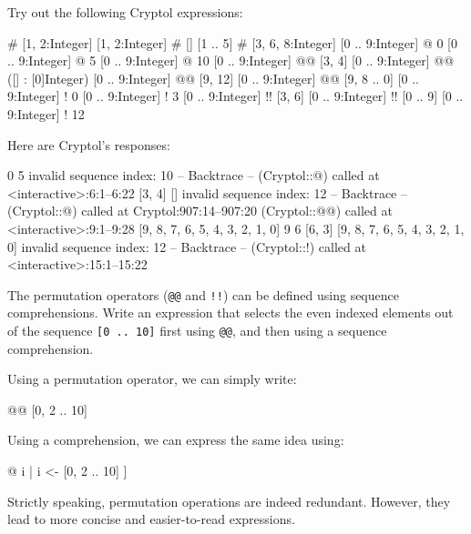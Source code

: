 
\restartrepl
\begin{Exercise}\label{ex:seq:7}
Try out the following Cryptol expressions:
\begin{replinVerb}
  [] # [1, 2:Integer]
  [1, 2:Integer] # []
  [1 .. 5] # [3, 6, 8:Integer]
  [0 .. 9:Integer] @ 0
  [0 .. 9:Integer] @ 5
  [0 .. 9:Integer] @ 10
  [0 .. 9:Integer] @@ [3, 4]
  [0 .. 9:Integer] @@ ([] : [0]Integer)
  [0 .. 9:Integer] @@ [9, 12]
  [0 .. 9:Integer] @@ [9, 8 .. 0]
  [0 .. 9:Integer] ! 0
  [0 .. 9:Integer] ! 3
  [0 .. 9:Integer] !! [3, 6]
  [0 .. 9:Integer] !! [0 .. 9]
  [0 .. 9:Integer] ! 12
\end{replinVerb}
\end{Exercise}
\begin{Answer}
Here are Cryptol's responses:
\begin{reploutVerb}
  [1, 2]
  [1, 2]
  [1, 2, 3, 4, 5, 3, 6, 8]
  0
  5
  invalid sequence index: 10
  -- Backtrace --
  (Cryptol::@) called at <interactive>:6:1--6:22
  [3, 4]
  []
  invalid sequence index: 12
   -- Backtrace --
  (Cryptol::@) called at Cryptol:907:14--907:20
  (Cryptol::@@) called at <interactive>:9:1--9:28
  [9, 8, 7, 6, 5, 4, 3, 2, 1, 0]
  9
  6
  [6, 3]
  [9, 8, 7, 6, 5, 4, 3, 2, 1, 0]
  invalid sequence index: 12
  -- Backtrace --
  (Cryptol::!) called at <interactive>:15:1--15:22
\end{reploutVerb}
\end{Answer}

\restartrepl
\begin{Exercise}\label{ex:seq:8}
  The permutation operators ({\tt @@} and {\tt !!}) can be defined
  using sequence comprehensions.  Write an expression that selects the
  even indexed elements out of the sequence \texttt{[0 ..\ 10]} first
  using {\tt @@}, and then using a sequence comprehension.
\end{Exercise}
\begin{Answer}
Using a permutation operator, we can simply write:
\begin{replinVerb}
  [0 .. 10] @@ [0, 2 .. 10]
\end{replinVerb}
Using a comprehension, we can express the same idea using:
\begin{replinVerb}
  [ [0 .. 10] @ i | i <- [0, 2 .. 10] ]
\end{replinVerb}
Strictly speaking, permutation operations are indeed redundant.
However, they lead to more concise and easier-to-read expressions.
\end{Answer}

